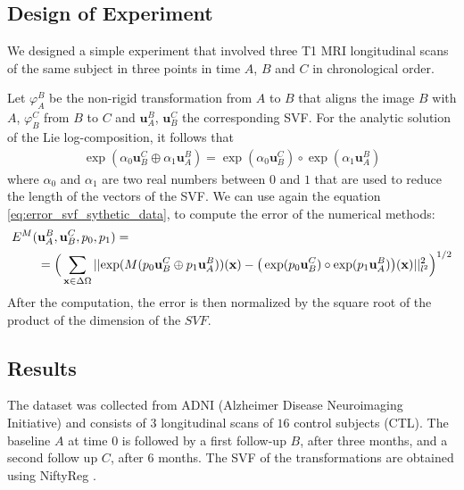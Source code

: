 \subsection{Design of Experiment}
We designed a simple experiment that involved three T1 MRI longitudinal scans of the same subject in three points in time $A$, $B$ and $C$ in chronological order.

Let $\varphi_{A}^{B}$ be the non-rigid transformation from $A$ to $B$ that aligns the image $B$ with $A$, $\varphi_{B}^{C}$ from $B$ to $C$ and $\mathbf{u}_{A}^{B}$, $\mathbf{u}_{B}^{C}$ the corresponding SVF.
For the analytic solution of the Lie log-composition, it follows that
\begin{align*}
	\exp(\alpha_0\mathbf{u}_{B}^{C} \oplus \alpha_1\mathbf{u}_{A}^{B})
	=
	\exp(\alpha_0\mathbf{u}_{B}^{C}) \circ\exp(\alpha_1\mathbf{u}_{A}^{B})
\end{align*} 
where $\alpha_0$ and $\alpha_1$ are two real numbers between $0$ and $1$ that are used to reduce the length of the vectors of the SVF.
We can use again the equation \ref{eq:error_svf_sythetic_data}, to compute the error of the numerical methods:
\begin{equation}
\begin{aligned}\label{eq:error_log_composition_real_data}
E^{M}(&\mathbf{u}_{A}^{B}, \mathbf{u}_{B}^{C}, p_0, p_1) = \\
&= 
\Big( \sum_{\mathbf{x} \in \Delta\Omega} 
\vert\lvert 
	\exp(M(p_0\mathbf{u}_{B}^{C} \oplus p_1\mathbf{u}_{A}^{B}))(\mathbf{x}) 
	-
	\big(\exp(p_0\mathbf{u}_{B}^{C}) \circ\exp(p_1\mathbf{u}_{A}^{B})\big)(\mathbf{x}) 
 \rvert\vert_{l^2}^{2}  \Big)^{1/2}
\end{aligned}
\end{equation}
After the computation, the error is then normalized by the square root of the product of the dimension of the $SVF$.

\subsection{Results}
%
The dataset was collected from ADNI (Alzheimer Disease Neuroimaging Initiative) \cite{jack2008alzheimer} and consists of $3$ longitudinal scans of $16$ control subjects (CTL).
The baseline $A$ at time $0$ is followed by a first follow-up $B$, after three months, and a second follow up $C$, after $6$ months. The SVF of the transformations are obtained using NiftyReg \cite{modat2010fast}. 

